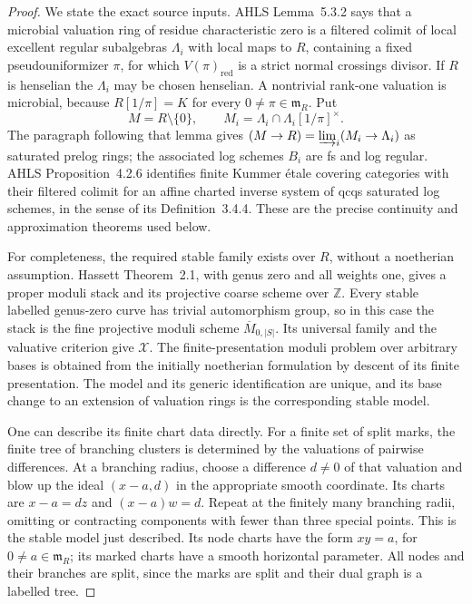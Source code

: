 \begin{proof}
We state the exact source inputs. AHLS Lemma~5.3.2 says that a
microbial valuation ring of residue characteristic zero is a
filtered colimit of local excellent regular subalgebras
$\Lambda_i$ with local maps to $R$, containing a fixed
pseudouniformizer $\pi$, for which $V(\pi)_{\mathrm{red}}$ is
a strict normal crossings divisor. If $R$ is henselian the
$\Lambda_i$ may be chosen henselian. A nontrivial rank-one
valuation is microbial, because $R[1/\pi]=K$ for every
$0\ne\pi\in\mathfrak m_R$. Put
\[
 M=R\setminus\{0\},\qquad
 M_i=\Lambda_i\cap\Lambda_i[1/\pi]^\times.
\]
The paragraph following that lemma gives
$(M\to R)=\varinjlim_i(M_i\to\Lambda_i)$ as saturated prelog
rings; the associated log schemes $B_i$ are fs and log regular.
AHLS Proposition~4.2.6 identifies finite Kummer \'etale covering
categories with their filtered colimit for an affine charted
inverse system of qcqs saturated log schemes, in the sense of its
Definition~3.4.4. These are the precise continuity and approximation
theorems used below.\citep[Definition~3.4.4,
Proposition~4.2.6, Lemma~5.3.2]{LA_AHLS2024}

For completeness, the required stable family exists over $R$,
without a noetherian assumption. Hassett Theorem~2.1, with genus
zero and all weights one, gives a proper moduli stack and its
projective coarse scheme over $\mathbb Z$. Every stable labelled
genus-zero curve has trivial automorphism group, so in this case
the stack is the fine projective moduli scheme
$\overline M_{0,|S|}$. Its universal family and the valuative
criterion give $\mathscr X$. The finite-presentation moduli
problem over arbitrary bases is obtained from the initially
noetherian formulation by descent of its finite presentation.
The model and its generic identification are unique, and its base
change to an extension of valuation rings is the corresponding
stable model.\citep[Theorem~2.1]{LA_Hassett2003}

One can describe its finite chart data directly. For a finite set
of split marks, the finite tree of branching clusters is determined
by the valuations of pairwise differences. At a branching radius,
choose a difference $d\ne0$ of that valuation and blow up the ideal
$(x-a,d)$ in the appropriate smooth coordinate. Its charts are
$x-a=dz$ and $(x-a)w=d$. Repeat at the finitely many branching
radii, omitting or contracting components with fewer than three
special points. This is the stable model just described. Its node
charts have the form $xy=a$, for $0\ne a\in\mathfrak m_R$;
its marked charts have a smooth horizontal parameter. All nodes
and their branches are split, since the marks are split and their
dual graph is a labelled tree.


\end{proof}
